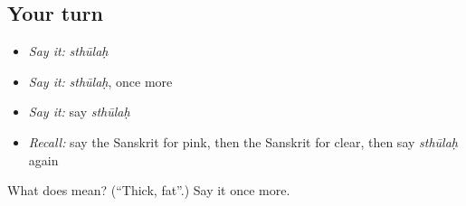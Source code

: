 \subsection*{Your turn}
\begin{itemize}
\raggedright
  \item \emph{Say it:} \emph{sthūlaḥ}
  \item \emph{Say it:} \emph{sthūlaḥ}, once more
  \item \emph{Say it:} say \emph{sthūlaḥ}
  \item \emph{Recall:} say the Sanskrit for pink, then the Sanskrit for clear, then say \emph{sthūlaḥ} again
\end{itemize}

\begin{tcolorbox}[breakable,colback=teal!4,colframe=teal!35!black,title={Before you move on}]
What does  mean? (\textquotedblleft{}Thick, fat\textquotedblright{}.) Say it once more.
\end{tcolorbox}

